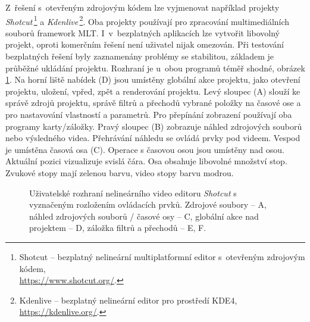 Z~řešení s~otevřeným zdrojovým kódem lze vyjmenovat například projekty \textit{Shotcut}\,\footnote{Shotcut -- bezplatný nelineární multiplatformní editor s~otevřeným zdrojovým kódem,\\\url{https://www.shotcut.org/}.} a \textit{Kdenlive}\,\footnote{Kdenlive -- bezplatný nelineární editor pro prostředí KDE4, \url{https://kdenlive.org/}.}. Oba projekty používají pro zpracování multimediálních souborů framework MLT. I~v~bezplatných aplikacích lze vytvořit libovolný projekt, oproti komerčním řešení není uživatel nijak omezován. Při testování bezplatných řešení byly zaznamenány problémy se stabilitou, základem je průběžné ukládání projektu. Rozhraní je u~obou programů téměř shodné, obrázek \ref{img:shotcut}. Na horní liště nabídek (D) jsou umístěny globální akce projektu, jako otevření projektu, uložení, vpřed, zpět a renderování projektu. Levý sloupec (A) slouží ke správě zdrojů projektu, správě filtrů a přechodů vybrané položky na časové ose a pro nastavování vlastností a parametrů. Pro přepínání zobrazení používají oba programy karty/záložky. Pravý sloupec (B) zobrazuje náhled zdrojových souborů nebo výsledného videa. Přehrávání náhledu se ovládá prvky pod videem. Vespod je umístěna časová osa (C). Operace s časovou osou jsou umístěny nad osou. Aktuální pozici vizualizuje svislá čára. Osa obsahuje libovolné množství stop. Zvukové stopy mají zelenou barvu, video stopy barvu modrou.
\begin{figure}[h]
	\centering
	\caption{Uživatelské rozhraní nelineárního video editoru \textit{Shotcut} s vyznačeným rozložením ovládacích prvků. Zdrojové soubory -- A, náhled zdrojových souborů / časové osy -- C, globální akce nad projektem -- D, záložka filtrů a přechodů -- E, F.}\label{img:shotcut}
\end{figure}

